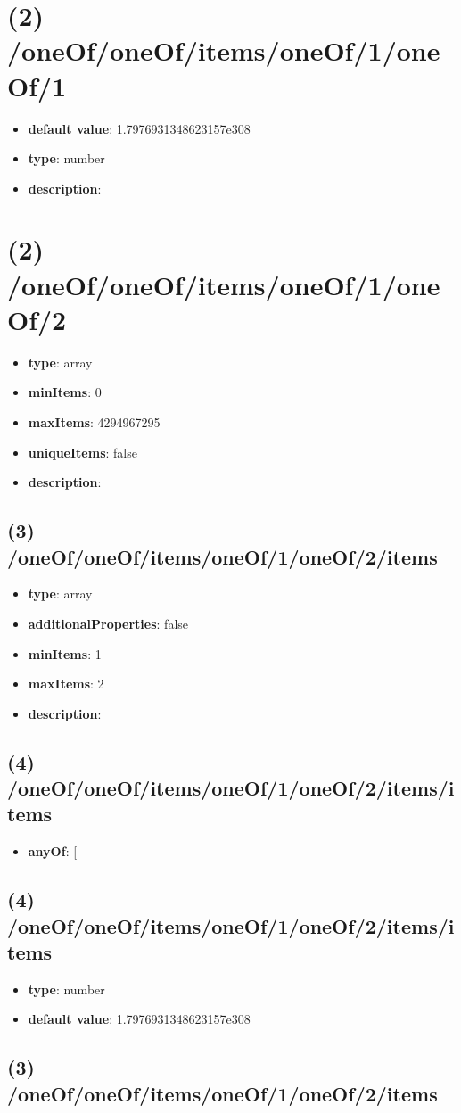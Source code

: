 \section{(2) /oneOf/oneOf/items/oneOf/1/oneOf/1}
\begin{itemize}[leftmargin=2em]\item {\bf default value}: 1.7976931348623157e308
\item {\bf type}: number
\item {\bf description}: 
\end{itemize}\section{(2) /oneOf/oneOf/items/oneOf/1/oneOf/2}
\begin{itemize}[leftmargin=2em]\item {\bf type}: array
\item {\bf minItems}: 0
\item {\bf maxItems}: 4294967295
\item {\bf uniqueItems}: false
\item {\bf description}: 
\end{itemize}\subsection{(3) /oneOf/oneOf/items/oneOf/1/oneOf/2/items}
\begin{itemize}[leftmargin=3em]\item {\bf type}: array
\item {\bf additionalProperties}: false
\item {\bf minItems}: 1
\item {\bf maxItems}: 2
\item {\bf description}: 
\end{itemize}\subsection{(4) /oneOf/oneOf/items/oneOf/1/oneOf/2/items/items}
\begin{itemize}[leftmargin=4em]\item {\bf anyOf}: [\end{itemize}\subsection{(4) /oneOf/oneOf/items/oneOf/1/oneOf/2/items/items}
\begin{itemize}[leftmargin=4em]\item {\bf type}: number\item {\bf default value}: 1.7976931348623157e308
\end{itemize}\subsection{(3) /oneOf/oneOf/items/oneOf/1/oneOf/2/items}
